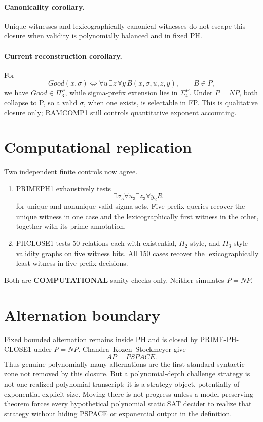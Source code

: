 \documentclass[11pt]{article}
\begin{document}
\paragraph{Canonicality corollary.}
Unique witnesses and lexicographically canonical witnesses do not escape this closure when validity
is polynomially balanced and in fixed PH.

\paragraph{Current reconstruction corollary.}
For
\[
Good(x,\sigma)
\iff
\forall u\,\exists z\,\forall y\,B(x,\sigma,u,z,y),
\qquad B\in P,
\]
we have \(Good\in\Pi_3^P\), while sigma-prefix extension lies in \(\Sigma_4^P\). Under
\(P=NP\), both collapse to P, so a valid \(\sigma\), when one exists, is selectable in FP.
This is qualitative closure only; RAMCOMP1 still controls quantitative exponent accounting.

\section*{Computational replication}
Two independent finite controls now agree.

\begin{enumerate}
\item PRIMEPH1 exhaustively tests
\[
\exists\sigma_5\forall u_3\exists z_3\forall y_2 R
\]
for unique and nonunique valid sigma sets. Five prefix queries recover the unique witness in one
case and the lexicographically first witness in the other, together with its prime annotation.
\item PHCLOSE1 tests 50 relations each with existential, \(\Pi_2\)-style, and \(\Pi_3\)-style
validity graphs on five witness bits. All 150 cases recover the lexicographically least witness in
five prefix decisions.
\end{enumerate}

Both are \textbf{COMPUTATIONAL} sanity checks only. Neither simulates \(P=NP\).

\section*{Alternation boundary}
Fixed bounded alternation remains inside PH and is closed by PRIME-PH-CLOSE1 under \(P=NP\).
Chandra--Kozen--Stockmeyer give
\[
\boxed{AP=PSPACE.}
\]
Thus genuine polynomially many alternations are the first standard syntactic zone not removed by
this closure. But a polynomial-depth challenge strategy is not one realized polynomial transcript;
it is a strategy object, potentially of exponential explicit size. Moving there is not progress
unless a model-preserving theorem forces every hypothetical polynomial static SAT decider to realize
that strategy without hiding PSPACE or exponential output in the definition.
\end{document}
